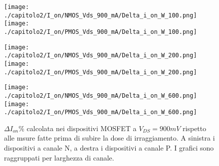 \begin{figure}[h]
    \centering
    \texttt{[image: ./capitolo2/I\_on/NMOS\_Vds\_900\_mA/Delta\_i\_on\_W\_100.png]}
    \texttt{[image: ./capitolo2/I\_on/PMOS\_Vds\_900\_mA/Delta\_i\_on\_W\_100.png]}

    \vspace{0.5cm}
    \texttt{[image: ./capitolo2/I\_on/NMOS\_Vds\_900\_mA/Delta\_i\_on\_W\_200.png]}
    \texttt{[image: ./capitolo2/I\_on/PMOS\_Vds\_900\_mA/Delta\_i\_on\_W\_200.png]}

    \vspace{0.5cm}

    \texttt{[image: ./capitolo2/I\_on/NMOS\_Vds\_900\_mA/Delta\_i\_on\_W\_600.png]}
    \texttt{[image: ./capitolo2/I\_on/PMOS\_Vds\_900\_mA/Delta\_i\_on\_W\_600.png]}

    \caption[Dati $\Delta I_{on}\%$ a $V_{DS}=440mV$ ]{$\Delta I_{on}\%$ calcolata nei dispositivi MOSFET a $V_{DS} = 900mV$ rispetto alle msure fatte prima di subire la dose di irraggiamento. A sinistra i dispositivi a canale N, a destra i dispositivi a canale P. I grafici sono raggruppati per larghezza di canale.}
    \label{fig:delta_I_on_vds_900_mv}

\end{figure}


